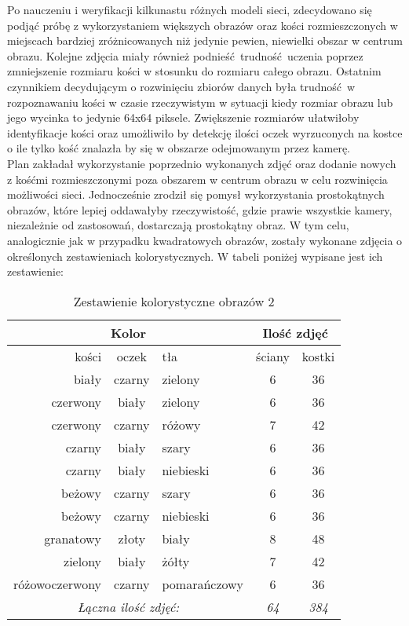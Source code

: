 Po nauczeniu i weryfikacji kilkunastu różnych modeli sieci, zdecydowano się podjąć
próbę z wykorzystaniem większych obrazów oraz kości rozmieszczonych w miejscach
bardziej zróżnicowanych niż jedynie pewien, niewielki obszar w centrum obrazu.
Kolejne zdjęcia miały również podnieść trudność uczenia poprzez zmniejszenie
rozmiaru kości w stosunku do rozmiaru całego obrazu. Ostatnim czynnikiem decydującym o
rozwinięciu zbiorów danych była trudność w rozpoznawaniu kości w czasie rzeczywistym
w sytuacji kiedy rozmiar obrazu lub jego wycinka to jedynie 64x64 piksele. Zwiększenie
rozmiarów ułatwiłoby identyfikacje kości oraz umożliwiło by detekcję ilości oczek
wyrzuconych na kostce o ile tylko kość znalazła by się w obszarze odejmowanym przez kamerę. \\
Plan zakładał wykorzystanie poprzednio wykonanych zdjęć oraz dodanie nowych
z kośćmi rozmieszczonymi poza obszarem w centrum obrazu w celu rozwinięcia możliwości sieci.
Jednocześnie zrodził się pomysł wykorzystania prostokątnych obrazów, które lepiej oddawałyby
rzeczywistość, gdzie prawie wszystkie kamery, niezależnie od zastosowań, dostarczają
prostokątny obraz. W tym celu, analogicznie jak w przypadku kwadratowych obrazów,
zostały wykonane zdjęcia o określonych zestawieniach kolorystycznych. W tabeli poniżej
wypisane jest ich zestawienie:

\begin{table}[h!]
\centering
\begin{tabular}{rcl|cc}
 \multicolumn{3}{c}{Kolor} & \multicolumn{2}{c}{Ilość zdjęć} \\ \hline
kości & oczek & tła & ściany & kostki \\ \hline
biały & czarny & zielony & 6 & 36 \\
czerwony & biały & zielony & 6 & 36 \\
czerwony & czarny & różowy & 7 & 42 \\
czarny & biały & szary & 6 & 36 \\
czarny & biały & niebieski & 6 & 36 \\
beżowy & czarny & szary & 6 & 36 \\
beżowy & czarny & niebieski & 6 & 36 \\
granatowy & złoty & biały & 8 & 48 \\
zielony & biały & żółty & 7 & 42 \\
różowoczerwony & czarny & pomarańczowy & 6 & 36 \\ \hline
\multicolumn{3}{c}{\textit{Łączna ilość zdjęć:}} & \textit{64} & \textit{384}
\end{tabular}
\vspace{0.2cm}
\caption{Zestawienie kolorystyczne obrazów 2}
\label{tab:zestawienie2}
\end{table}

